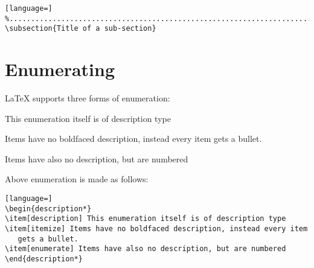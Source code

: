 \begin{lstlisting}[language=]
%..............................................................................
\subsection{Title of a sub-section}
\end{lstlisting}

\section{Enumerating}

LaTeX supports three forms of enumeration:
\begin{description*}
\item[description] This enumeration itself is of description type
\item[itemize] Items have no boldfaced description, instead every item
   gets a bullet.
\item[enumerate] Items have also no description, but are numbered
\end{description*}

\noindent
Above enumeration is made as follows:

\begin{lstlisting}[language=]
\begin{description*}
\item[description] This enumeration itself is of description type
\item[itemize] Items have no boldfaced description, instead every item
   gets a bullet.
\item[enumerate] Items have also no description, but are numbered
\end{description*}
\end{lstlisting}

